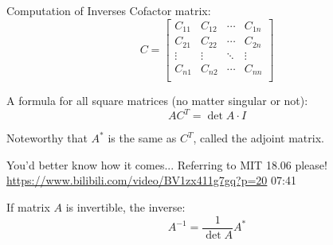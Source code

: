 \documentclass{beamer}
\begin{document}
\begin{frame}{Computation of Inverses}
Cofactor matrix:
\begin{equation*}
    C=\left[ \begin{matrix}
        C_{11}&		C_{12}&		\cdots&		C_{1n}\\
        C_{21}&		C_{22}&		\cdots&		C_{2n}\\
        \vdots&		\vdots&		\ddots&		\vdots\\
        C_{n1}&		C_{n2}&		\cdots&		C_{nn}\\
    \end{matrix} \right]
\end{equation*}


A formula for all square matrices (no matter singular or not):
\begin{equation*}
    AC^T=\det A \cdot I
\end{equation*}

Noteworthy that $A^*$ is the same as $C^T$, called the adjoint matrix.

\vspace{3pt}
You'd better know how it comes... Referring to MIT 18.06 please!
\url{https://www.bilibili.com/video/BV1zx411g7gq?p=20} 07:41

\vspace{3pt}
If matrix $A$ is invertible, the inverse:
\begin{equation*}
    A^{-1}=\frac{1}{\det A}A^*
\end{equation*}

\end{frame}
\end{document}
